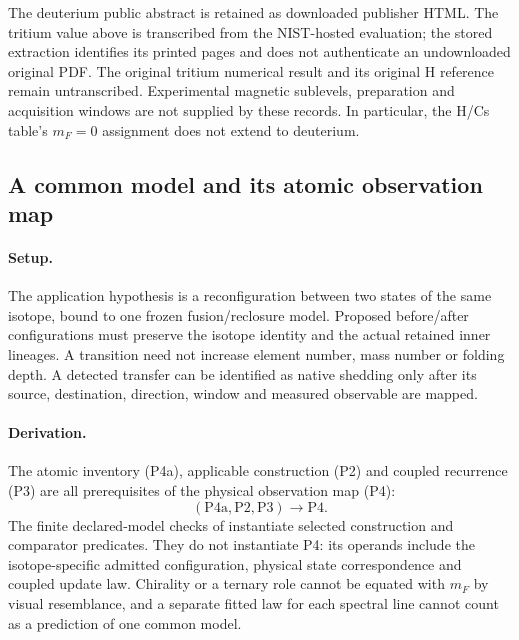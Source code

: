 The deuterium public abstract is retained as downloaded publisher HTML.
The tritium value above is transcribed from the NIST-hosted evaluation;
the stored extraction identifies its printed pages and does not authenticate
an undownloaded original PDF. The original tritium numerical result and its
original H reference remain untranscribed. Experimental magnetic sublevels,
preparation and acquisition windows are not supplied by these records. In
particular, the H/Cs table's \(m_F=0\) assignment does not extend to deuterium.


\subsection{A common model and its atomic observation map}
\paragraph{Setup.}
The application hypothesis is a reconfiguration between two states of the same isotope, bound to one frozen fusion/reclosure model. Proposed before/after configurations must preserve the isotope identity and the actual retained inner lineages. A transition need not increase element number, mass number or folding depth. A detected transfer can be identified as native shedding only after its source, destination, direction, window and measured observable are mapped.

\paragraph{Derivation.}
The atomic inventory (P4a), applicable construction (P2) and coupled recurrence (P3) are all prerequisites of the physical observation map (P4):
\[
(\mathrm{P4a},\mathrm{P2},\mathrm{P3})\longrightarrow\mathrm{P4}.
\]
The finite declared-model checks of  instantiate selected construction and comparator predicates. They do not instantiate P4: its operands include the isotope-specific admitted configuration, physical state correspondence and coupled update law. Chirality or a ternary role cannot be equated with \(m_F\) by visual resemblance, and a separate fitted law for each spectral line cannot count as a prediction of one common model.

